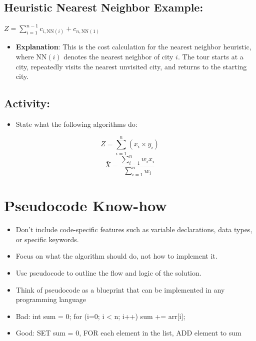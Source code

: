 \documentclass[
  letterpaper,
  DIV=11,
  numbers=noendperiod]{scrreprt}
\providecommand{\tightlist}{%
  \setlength{\itemsep}{0pt}\setlength{\parskip}{0pt}}\usepackage{longtable,booktabs,array}
\begin{document}
\section{Heuristic Nearest Neighbor
Example:}\label{heuristic-nearest-neighbor-example}

\(Z = \sum_{i=1}^{n-1} c_{i, \text{NN}(i)} + c_{n, \text{NN}(1)}\)

\begin{itemize}
\tightlist
\item
  \textbf{Explanation}: This is the cost calculation for the nearest
  neighbor heuristic, where \(\text{NN}(i)\) denotes the nearest
  neighbor of city \(i\). The tour starts at a city, repeatedly visits
  the nearest unvisited city, and returns to the starting city.
\end{itemize}

\section{Activity:}\label{activity}

\begin{itemize}
\tightlist
\item
  State what the following algorithms do:
\end{itemize}

\[Z = \sum_{i=1}^n \left( x_i \times y_i \right)\]
\[ \bar{X} = \frac{\sum_{i=1}^{n} w_i x_i}{\sum_{i=1}^{n} w_i}\]


\chapter{Pseudocode Know-how}\label{pseudocode-know-how}

\begin{itemize}
\item
  Don't include code-specific features such as variable declarations,
  data types, or specific keywords.
\item
  Focus on what the algorithm should do, not how to implement it.
\item
  Use pseudocode to outline the flow and logic of the solution.
\item
  Think of pseudocode as a blueprint that can be implemented in any
  programming language
\item
  Bad: int sum = 0; for (i=0; i \textless{} n; i++) sum += arr{[}i{]};
\item
  Good: SET sum = 0, FOR each element in the list, ADD element to sum
\end{itemize}
\end{document}
